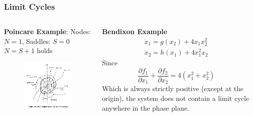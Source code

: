 \documentclass[11pt,handout]{beamer}   %
\begin{document}
\begin{frame}
\frametitle{Limit Cycles}
\small
\begin{columns}
\begin{column}{0.5\textwidth}
\textbf{Poincare Example}:
Nodes: $N = 1$, Saddles: $S=0$\\
$N=S+1$ holds
\begin{figure}
\centering
\includegraphics[width=1.0\textwidth]{Figures/Isocline_2.PNG}
\end{figure}
\end{column}
\begin{column}{0.5\textwidth}
\textbf{Bendixon Example}
\begin{eqnarray*}
\dot{x}_1 = g(x_2) + 4x_1x_2^2\\
\dot{x}_2 = h(x_1) + 4x_1^2x_2
\end{eqnarray*}
Since
\begin{equation*}
\frac{\partial f_1}{\partial x_1} + \frac{\partial f_2}{\partial x_2} = 4(x_1^2+x_2^2) 
\end{equation*}
Which is always strictly positive (except at the origin), the system does not contain a limit cycle anywhere in the phase plane.
\end{column}
\end{columns}
\end{frame}
\end{document}
